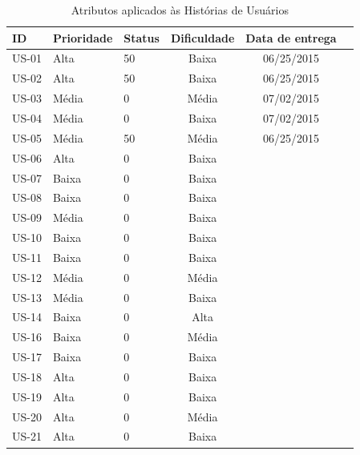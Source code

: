 \begin{table}
\centering
\caption{Atributos aplicados às Histórias de Usuários}
\label{tab:atri_historias}
\begin{tabular}{ | l | l | l | c | c | c |}
\hline
 ID  & Prioridade & Status & Dificuldade & Data de entrega \\ \hline
 US-01 & Alta     & 50               & Baixa       & 06/25/2015      \\\hline
 US-02 & Alta     & 50               & Baixa       & 06/25/2015      \\\hline
 US-03 & Média   & 0                & Média       & 07/02/2015      \\\hline
 US-04 & Média   & 0                & Baixa       & 07/02/2015      \\\hline
 US-05 & Média   & 50               & Média       & 06/25/2015      \\\hline
 US-06 & Alta     & 0                & Baixa       &                 \\\hline
 US-07 & Baixa      & 0                & Baixa       &                 \\\hline
 US-08 & Baixa      & 0                & Baixa       &                 \\\hline
 US-09 & Média   & 0                & Baixa       &                 \\\hline
 US-10 & Baixa      & 0                & Baixa       &                 \\\hline
 US-11 & Baixa      & 0                & Baixa       &                 \\\hline
 US-12 & Média   & 0                & Média       &                 \\\hline
 US-13 & Média   & 0                & Baixa       &                 \\\hline
 US-14 & Baixa      & 0                & Alta        &                 \\\hline
 US-16 & Baixa      & 0                & Média       &                 \\\hline
 US-17 & Baixa      & 0                & Baixa       &                 \\\hline
 US-18 & Alta     & 0                & Baixa       &                 \\\hline
 US-19 & Alta     & 0                & Baixa       &                 \\\hline
 US-20 & Alta     & 0                & Média       &                 \\\hline
 US-21 & Alta     & 0                & Baixa       &                 \\\hline

\end{tabular}
\end{table}

